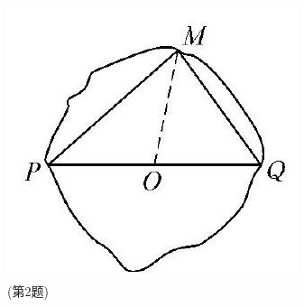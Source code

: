 \documentclass[10pt]{article}
\begin{document}
\begin{enumerate}
\includegraphics[max width=\textwidth, center]{2024_10_30_66b8e5e701da2093c133g-107}\\
(第2题)
\end{enumerate}
\end{document}
